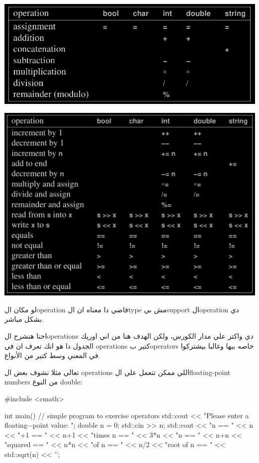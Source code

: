\documentclass[11pt]{article}
\let\OriginalVerbatim\verbatim
\let\endOriginalVerbatim\endverbatim
\renewenvironment{verbatim}{\begin{english}\OriginalVerbatim}{\endOriginalVerbatim\end{english}}
\begin{document}
\begin{center}
\includegraphics[width=.9\linewidth]{../images/operators1.png}
\end{center}
\begin{center}
\includegraphics[width=.9\linewidth]{../images/operators2.png}
\end{center}

لو مكان الoperation فاضي دا معناه ان الtype مش بيsupport الoperation دي بشكل مباشر.

احنا هنشرح الoperations دي واكتر علي مدار الكورس، ولكن الهدف هنا من اني اوريك الجدول دا هو انك تعرف ان في operations كتير بoperators خاصه بيها وغالبا بيشتركوا في المعني وسط كتير من الأنواع.

تعالي مثلا نشوف بعض ال operations اللي ممكن تتعمل علي الfloating-point numbers من النوع double:

\begin{verbatim}
#include <cmath>

int main() {
    // simple program to exercise operators
    std::cout << "Please enter a floating−point value: ";
    double n = 0;
    std::cin >> n;
    std::cout << "n == " << n
              << "\nn+1 == " << n+1
              << "\nthree times n == " << 3*n
              << "\ntwice n == " << n+n
              << "\nn squared == " << n*n
              << "\nhalf of n == " << n/2
              << "\nsquare root of n == " << std::sqrt(n)
              << '\n';
}
\end{verbatim}
\end{document}

